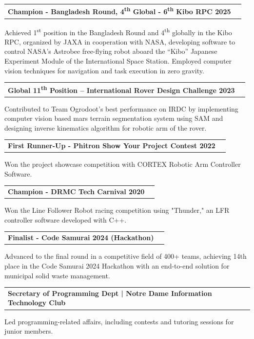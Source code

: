 \documentclass[letterpaper,11pt]{article}
\makeatletter
\newcommand{\resumeSubheading}[2]{
  \item
    \begin{tabularx}{0.97\textwidth}[t]{l@{\extracolsep{\fill}}r}
      \textbf{#1} & \small#2 \\
    \end{tabularx}
}
\newcommand{\resumeItem}[1]{\item\small #1}
\makeatother
\begin{document}
\begin{resumeSubHeadingList}

    \resumeSubheading
        {Champion - Bangladesh Round, 4\textsuperscript{th} Global - 6\textsuperscript{th} Kibo RPC 2025}{}{}
        {}
        \begin{resumeItemList}
            \resumeItem{Achieved 1\textsuperscript{st} position in the Bangladesh Round and 4\textsuperscript{th} globally in the Kibo RPC, organized by JAXA in cooperation with NASA, developing software to control NASA's Astrobee free-flying robot aboard the ``Kibo'' Japanese Experiment Module of the International Space Station. Employed computer vision techniques for navigation and task execution in zero gravity.}
        \end{resumeItemList}

        
    \resumeSubheading
        {Global 11\textsuperscript{th} Position – International Rover Design Challenge 2023}{}{}
        {}
        \begin{resumeItemList}
            \resumeItem{Contributed to Team Ogrodoot's best performance on IRDC by implementing computer vision based mars terrain segmentation system using SAM and designing inverse kinematics algorithm for robotic arm of the rover.}
        \end{resumeItemList}
        
    \resumeSubheading
        {First Runner-Up - Phitron Show Your Project Contest 2022}{}{}
        {}
        \begin{resumeItemList}
            \resumeItem{Won the project showcase competition with CORTEX Robotic Arm Controller Software.}
        \end{resumeItemList}
        
    \resumeSubheading
        {Champion - DRMC Tech Carnival 2020}{}{}
        {}
        \begin{resumeItemList}
            \resumeItem{Won the Line Follower Robot racing competition using "Thunder," an LFR controller software developed with C++.}
        \end{resumeItemList}
        
    \resumeSubheading
        {Finalist - Code Samurai 2024 (Hackathon)}{}{}
        {}
        \begin{resumeItemList}
            \resumeItem{Advanced to the final round in a competitive field of 400+ teams, achieving 14th place in the Code Samurai 2024 Hackathon with an end-to-end solution for municipal solid waste management.}
        \end{resumeItemList}

    \resumeSubheading
        {Secretary of Programming Dept | Notre Dame Information Technology Club}{}{}
        {}
        \begin{resumeItemList}
            \resumeItem{Led programming-related affairs, including contests and tutoring sessions for junior members.}
        \end{resumeItemList}

        

\end{resumeSubHeadingList}
\end{document}
